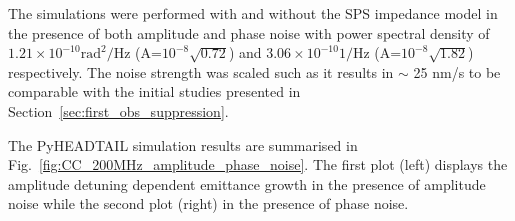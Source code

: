 The simulations were performed with and without the SPS impedance model in the presence of both amplitude and phase noise with power spectral density of $1.21 \times 10^{-10} \mathrm{rad^2/Hz}$ (A=$10^{-8}\sqrt{0.72}$) and $3.06 \times 10^{-10} \mathrm{1/Hz}$ (A=$10^{-8}\sqrt{1.82}$) respectively. The noise strength was scaled such as it results in $\sim$ 25 nm/s to be comparable with the initial studies presented in Section~\ref{sec:first_obs_suppression}.

The PyHEADTAIL simulation results are summarised in Fig.~\ref{fig:CC_200MHz_amplitude_phase_noise}. The first plot (left) displays the amplitude detuning dependent emittance growth in the presence of amplitude noise while the second plot (right) in the presence of phase noise. 

